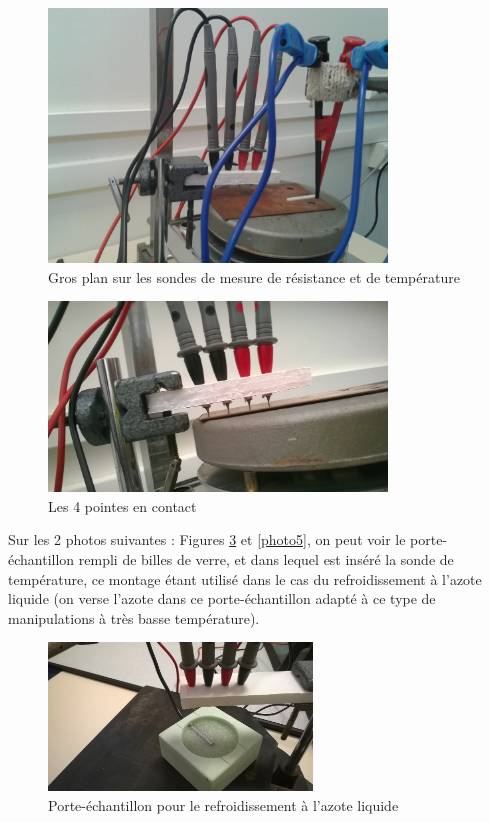 \newpage

\begin{figure}[!t]
  \begin{center}
		\includegraphics[width=9cm]{./images/photo2.jpg}
		\caption{Gros plan sur les sondes de mesure de résistance et de température}
		\label{photo2}
	\end{center}
\end{figure}
\begin{figure}[h]
  \begin{center}
		\includegraphics[width=9cm]{./images/photo3.jpg}
		\caption{Les 4 pointes en contact}
		\label{photo3}
	\end{center}
\end{figure}

Sur les 2 photos suivantes : Figures \ref{photo4} et \ref{photo5}, on peut voir le porte-échantillon rempli de billes de verre, et dans lequel est inséré la sonde de température, ce montage étant utilisé dans le cas du refroidissement à l'azote liquide (on verse l'azote dans ce porte-échantillon adapté à ce type de manipulations à très basse température).

\newpage

\begin{figure}[!t]
  \begin{center}
		\includegraphics[width=7cm]{./images/photo4.jpg}
		\caption{Porte-échantillon pour le refroidissement à l'azote liquide}
		\label{photo4}
	\end{center}
\end{figure}

